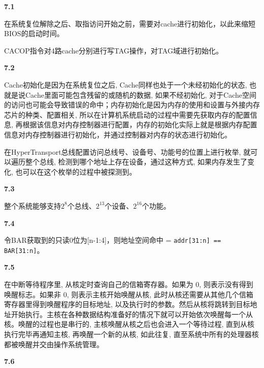 \documentclass[UTF8]{report}
\begin{document}
\pagestyle{fancy}

\maketitle

\noindent
\textbf{7.1}

在系统复位解除之后、取指访问开始之前，需要对cache进行初始化，以此来缩短BIOS的启动时间。

CACOP指令对4路cache分别进行写TAG操作，对TAG域进行初始化。

\noindent
\textbf{7.2}

Cache初始化是因为在系统复位之后, Cache同样也处于一个未经初始化的状态, 也就是说Cache里面可能包含残留的或随机的数据, 如果不经初始化, 对于Cache空间的访问也可能会导致错误的命中；内存初始化是因为内存的使用和设置与外接内存芯片的种类、配置相关, 所以在计算机系统启动的过程中需要先获取内存的配置信息, 再根据该信息对内存控制器进行配置，内存的初始化实际上就是根据内存配置信息对内存控制器进行初始化，并通过控制器对内存的状态进行初始化。

在HyperTransport总线配置访问总线号、设备号、功能号的位置上进行枚举, 就可以遍历整个总线, 检测到哪个地址上存在设备，通过这种方式, 如果内存发生了变化, 也可以在这个枚举的过程中被探测到。

\noindent
\textbf{7.3}

整个系统能够支持$2^8$个总线、$2^{13}$个设备、$2^{16}$个功能。

\noindent
\textbf{7.4}

令BAR获取到的只读0位为[n-1:4]，则地址空间命中 = \texttt{addr[31:n] == BAR[31:n]}。

\noindent
\textbf{7.5}

在中断等待程序里, 从核定时查询自己的信箱寄存器。如果为 0, 则表示没有得到唤醒标志。如果非 0, 则表示主核开始唤醒从核, 此时从核还需要从其他几个信箱寄存器里得到唤醒程序的目标地址, 以及执行时的参数。然后从核将跳转到目标地址开始执行。主核在各种数据结构准备好的情况下就可以开始依次唤醒每一个从核。唤醒的过程也是串行的, 主核唤醒从核之后也会进入一个等待过程, 直到从核执行完毕再通知主核, 再唤醒一个新的从核, 如此往复, 直至系统中所有的处理器核都被唤醒并交由操作系统管理。

\noindent
\textbf{7.6}
\end{document}
